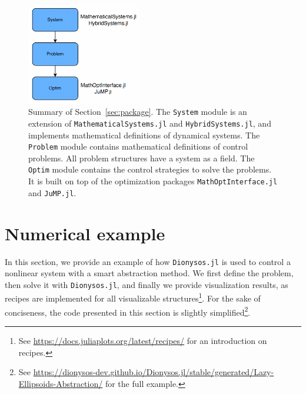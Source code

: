 \documentclass{juliacon}
\begin{document}
\begin{figure}[t]
    \centerline{\includegraphics[width=5cm]{Figures/Package/structure.png}}
    \caption{Summary of Section~\ref{sec:package}. The \texttt{System} module is an extension of \texttt{MathematicalSystems.jl} and \texttt{HybridSystems.jl}, and implements mathematical definitions of dynamical systems. The \texttt{Problem} module contains mathematical definitions of control problems. All problem structures have a system as a field. The \texttt{Optim} module contains the control strategies to solve the problems. It is built on top of the optimization packages \texttt{MathOptInterface.jl} and \texttt{JuMP.jl}.}
    \label{fig:structure}
\end{figure}


\section{Numerical example}
\label{sec:examples}

In this section, we provide an example of how \texttt{Dionysos.jl} is used to control a nonlinear system with a smart abstraction method. We first define the problem, then solve it with \texttt{Dionysos.jl}, and finally we provide visualization results, as recipes are implemented for all visualizable structures\footnote{See \url{https://docs.juliaplots.org/latest/recipes/} for an introduction on recipes.}. For the sake of conciseness, the code presented in this section is slightly simplified\footnote{See \url{https://dionysos-dev.github.io/Dionysos.jl/stable/generated/Lazy-Ellipsoids-Abstraction/} for the full example.}. 

\vskip 6pt
\end{document}
